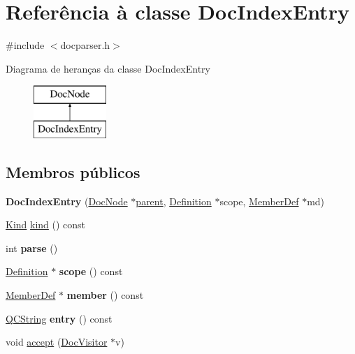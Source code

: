 \hypertarget{class_doc_index_entry}{\section{Referência à classe Doc\-Index\-Entry}
\label{class_doc_index_entry}
}


{\ttfamily \#include $<$docparser.\-h$>$}

Diagrama de heranças da classe Doc\-Index\-Entry\begin{figure}[H]
\begin{center}
\leavevmode
\includegraphics[height=2.000000cm]{class_doc_index_entry}
\end{center}
\end{figure}
\subsection*{Membros públicos}
\begin{DoxyCompactItemize}
\item 
\hypertarget{class_doc_index_entry_a86acebd12e4a62349306f3f1dae84f17}{{\bfseries Doc\-Index\-Entry} (\hyperlink{class_doc_node}{Doc\-Node} $\ast$\hyperlink{class_doc_node_abd7f070d6b0a38b4da71c2806578d19d}{parent}, \hyperlink{class_definition}{Definition} $\ast$scope, \hyperlink{class_member_def}{Member\-Def} $\ast$md)}\label{class_doc_index_entry_a86acebd12e4a62349306f3f1dae84f17}

\item 
\hyperlink{class_doc_node_aa10c9e8951b8ccf714a59ec321bdac5b}{Kind} \hyperlink{class_doc_index_entry_aa9d037bed9f9a083d0cd01485637d843}{kind} () const 
\item 
\hypertarget{class_doc_index_entry_a67007fc2be130666fbf3b065022756f4}{int {\bfseries parse} ()}\label{class_doc_index_entry_a67007fc2be130666fbf3b065022756f4}

\item 
\hypertarget{class_doc_index_entry_aef81f1b8388a5858832ef218a6b36e8d}{\hyperlink{class_definition}{Definition} $\ast$ {\bfseries scope} () const }\label{class_doc_index_entry_aef81f1b8388a5858832ef218a6b36e8d}

\item 
\hypertarget{class_doc_index_entry_a391f646a4e260ddd20fe97ea9b65e221}{\hyperlink{class_member_def}{Member\-Def} $\ast$ {\bfseries member} () const }\label{class_doc_index_entry_a391f646a4e260ddd20fe97ea9b65e221}

\item 
\hypertarget{class_doc_index_entry_a0d1456e5bb56d286443a5cb2bb8d97e2}{\hyperlink{class_q_c_string}{Q\-C\-String} {\bfseries entry} () const }\label{class_doc_index_entry_a0d1456e5bb56d286443a5cb2bb8d97e2}

\item 
void \hyperlink{class_doc_index_entry_a7ba716e854ae2f8f87a4eb2140e302b6}{accept} (\hyperlink{class_doc_visitor}{Doc\-Visitor} $\ast$v)
\end{DoxyCompactItemize}
